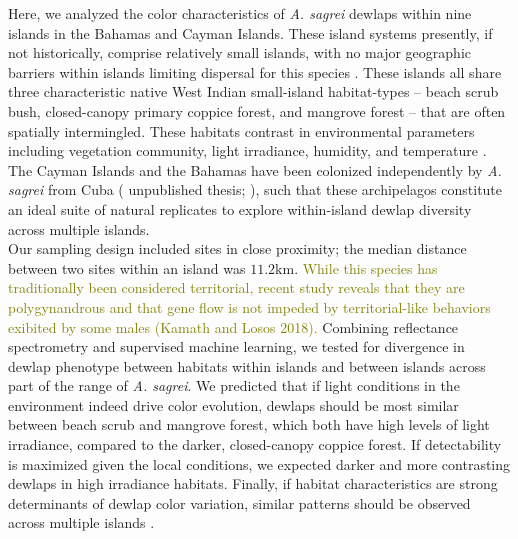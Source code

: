Here, we analyzed the color characteristics of \textit{A. sagrei} dewlaps within nine islands in the Bahamas and Cayman Islands. These island systems presently, if not historically, comprise relatively small islands, with no major geographic barriers within islands limiting dispersal for this species \citep{Kamath2018}. These islands all share three characteristic native West Indian small-island habitat-types -- beach scrub bush, closed-canopy primary coppice forest, and mangrove forest -- that are often spatially intermingled. These habitats contrast in environmental parameters including vegetation community, light irradiance, humidity, and temperature \citep{Howard1950, Schoener1968}. The Cayman Islands and the Bahamas have been colonized independently by \textit{A. sagrei} from Cuba (\citealt{vandeSchoot2016} unpublished thesis; \citealt{Reynolds2020}), such that these archipelagos constitute an ideal suite of natural replicates to explore within-island dewlap diversity across multiple islands.\\

Our sampling design included sites in close proximity; the median distance between two sites within an island was $11.2$km. \textcolor{olive}{While this species has traditionally been considered territorial, recent study reveals that they are polygynandrous and that gene flow is not impeded by territorial-like behaviors exibited by some males (Kamath and Losos 2018).} Combining reflectance spectrometry and supervised machine learning, we tested for divergence in dewlap phenotype between habitats within islands and between islands across part of the range of \textit{A. sagrei}. We predicted that if light conditions in the environment indeed drive color evolution, dewlaps should be most similar between beach scrub and mangrove forest, which both have high levels of light irradiance, compared to the darker, closed-canopy coppice forest. If detectability is maximized given the local conditions, we expected darker and more contrasting dewlaps in high irradiance habitats. Finally, if habitat characteristics are strong determinants of dewlap color variation, similar patterns should be observed across multiple islands \citep{Harvey1991, Losos2011}.